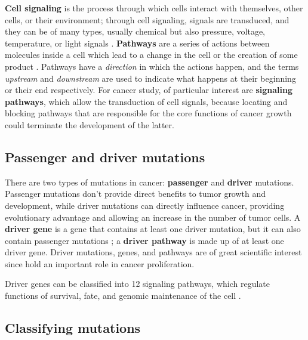 \textbf{Cell signaling} is the process through which cells interact with themselves, other cells, or their environment; through cell signaling, signals are transduced, and they can be of many types, usually chemical but also pressure, voltage, temperature, or light signals \cite{cell_signaling}. \textbf{Pathways} are a series of actions between molecules inside a cell which lead to a change in the cell or the creation of some product \cite{pathway}. Pathways have a \textit{direction} in which the actions happen, and the terms \textit{upstream} and \textit{downstream} are used to indicate what happens at their beginning or their end respectively. For cancer study, of particular interest are \textbf{signaling pathways}, which allow the transduction of cell signals, because locating and blocking pathways that are responsible for the core functions of cancer growth could terminate the development of the latter. 

\subsection{Passenger and driver mutations}

There are two types of mutations in cancer: \textbf{passenger} and \textbf{driver} mutations. Passenger mutations don't provide direct benefits to tumor growth and development, while driver mutations can directly influence cancer, providing evolutionary advantage and allowing an increase in the number of tumor cells. A \textbf{driver gene} is a gene that contains at least one driver mutation, but it can also contain passenger mutations ; a \textbf{driver pathway} is made up of at least one driver gene. Driver mutations, genes, and pathways are of great scientific interest since hold an important role in cancer proliferation.

Driver genes can be classified into 12 signaling pathways, which regulate functions of survival, fate, and genomic maintenance of the cell .

\subsection{Classifying mutations}

